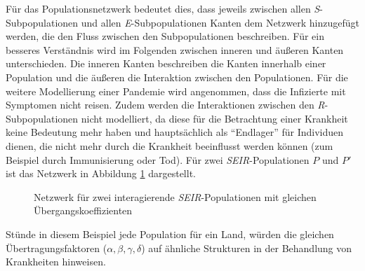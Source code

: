 Für das Populationsnetzwerk bedeutet dies, dass jeweils zwischen allen \emph{S}-Subpopulationen und allen \emph{E}-Subpopulationen Kanten dem Netzwerk hinzugefügt werden, die den Fluss zwischen den Subpopulationen beschreiben. Für ein besseres Verständnis wird im Folgenden zwischen inneren und äußeren Kanten unterschieden. Die inneren Kanten beschreiben die Kanten innerhalb einer Population und die äußeren die Interaktion zwischen den Populationen. Für die weitere Modellierung einer Pandemie wird angenommen, dass die Infizierte mit Symptomen nicht reisen. Zudem werden die Interaktionen zwischen den \emph{R}-Subpopulationen nicht modelliert, da diese für die Betrachtung einer Krankheit keine Bedeutung mehr haben und hauptsächlich als ``Endlager'' für Individuen dienen, die nicht mehr durch die Krankheit beeinflusst werden können (zum Beispiel durch Immunisierung oder Tod). Für zwei \emph{SEIR}-Populationen $P$ und $P'$ ist das Netzwerk in Abbildung \ref{fig:ssec:multiPop:2interactingSEIR} dargestellt. 
\begin{figure}
\begin{center}
\end{center}
\caption{Netzwerk für zwei interagierende \emph{SEIR}-Populationen mit gleichen Übergangskoeffizienten}\label{fig:ssec:multiPop:2interactingSEIR}
\end{figure}

Stünde in diesem Beispiel jede Population für ein Land, würden die gleichen Übertragungsfaktoren ($\alpha, \beta, \gamma, \delta$) auf ähnliche Strukturen in der Behandlung von Krankheiten hinweisen. 

